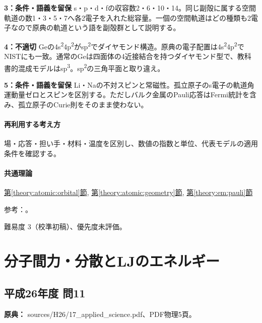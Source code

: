 \noindent\textbf{3：条件・語義を留保} s・p・d・fの収容数2・6・10・14。同じ副殻に属する空間軌道の数1・3・5・7へ各2電子を入れた総容量。一個の空間軌道はどの種類も2電子なので原典の軌道という語を副殻群として説明する。\par

\noindent\textbf{4：不適切} Geの4s\textsuperscript{2}4p\textsuperscript{2}がsp\textsuperscript{2}でダイヤモンド構造。原典の電子配置は4s\textsuperscript{2}4p\textsuperscript{2}でNISTにも一致。通常のGeは四面体の4近接結合を持つダイヤモンド型で、教科書的混成モデルはsp\textsuperscript{3}。sp\textsuperscript{2}の三角平面と取り違え。\par

\noindent\textbf{5：条件・語義を留保} Li・Naの不対スピンと常磁性。孤立原子のs電子の軌道角運動量ゼロとスピンを区別する。ただしバルク金属のPauli応答はFermi統計を含み、孤立原子のCurie則をそのまま使わない。\par

\paragraph{再利用する考え方} 場・応答・担い手・材料・温度を区別し、数値の指数と単位、代表モデルの適用条件を確認する。

\paragraph{共通理論} \hyperref[theory:atomic:orbital]{第\ref*{theory:atomic:orbital}節}, \hyperref[theory:atomic:geometry]{第\ref*{theory:atomic:geometry}節}, \hyperref[theory:em:pauli]{第\ref*{theory:em:pauli}節}

\par 参考：\cite{atomic_quantum,em51_ge,em51_ge_structure,mit_semiconductor,em51_pauli}。

\par 難易度 3（校準初稿）、優先度未評価。

\section{分子間力・分散とLJのエネルギー}

\subsection{平成26年度 問11}
\label{q:h26-reg-applied-11}

\noindent\textbf{原典：} sources/H26/17\_applied\_science.pdf、PDF物理5頁。

